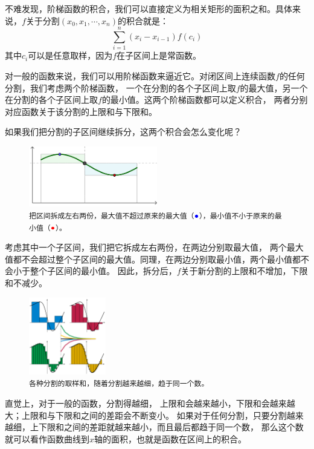 \documentclass[12pt,UTF8]{ctexbook}
\begin{document}
\begin{appendix}
不难发现，阶梯函数的积合，我们可以直接定义为相关矩形的面积之和。具体来说，$f$关于分割$(x_0, x_1, \cdots, x_n)$的积合就是：
$$ \sum_{i=1}^n (x_i - x_{i-1}) f(c_i) $$
其中$c_i$可以是任意取样，因为$f$在子区间上是常函数。

对一般的函数来说，我们可以用阶梯函数来逼近它。对闭区间上连续函数$f$的任何分割，我们考虑两个阶梯函数，
一个在分割的各个子区间上取$f$的最大值，另一个在分割的各个子区间上取$f$的最小值。这两个阶梯函数都可以定义积合，
两者分别对应函数关于该分割的上限和与下限和。

如果我们把分割的子区间继续拆分，这两个积合会怎么变化呢？

\begin{figure} 
    \vspace{-32pt}
    \flushleft
    \includegraphics[width=0.5\textwidth]{tu/积分定义2.png}
    \caption*{\texttt{把区间拆成左右两份，最大值不超过原来的最大值（${\color{blue} \bullet}$），最小值不小于原来的最小值（${\color{red} \bullet}$）。}}
\end{figure}

考虑其中一个子区间，我们把它拆成左右两份，在两边分别取最大值，
两个最大值都不会超过整个子区间的最大值。同理，在两边分别取最小值，两个最小值都不会小于整个子区间的最小值。
因此，拆分后，$f$关于新分割的上限和不增加，下限和不减少。

\begin{figure} %
    \vspace{-35pt}
    \flushright
    \includegraphics[width=0.3\textwidth]{tu/积分定义6.png}
    \caption*{\texttt{各种分割的取样和，随着分割越来越细，趋于同一个数。}}
\end{figure}

直觉上，对于一般的函数，分割得越细，
上限和会越来越小，下限和会越来越大；上限和与下限和之间的差距会不断变小。
如果对于任何分割，只要分割越来越细，上下限和之间的差距就越来越小，而且最后都趋于同一个数，
那么这个数就可以看作函数曲线到$x$轴的面积，也就是函数在区间上的积合。


\end{appendix}
\end{document}
